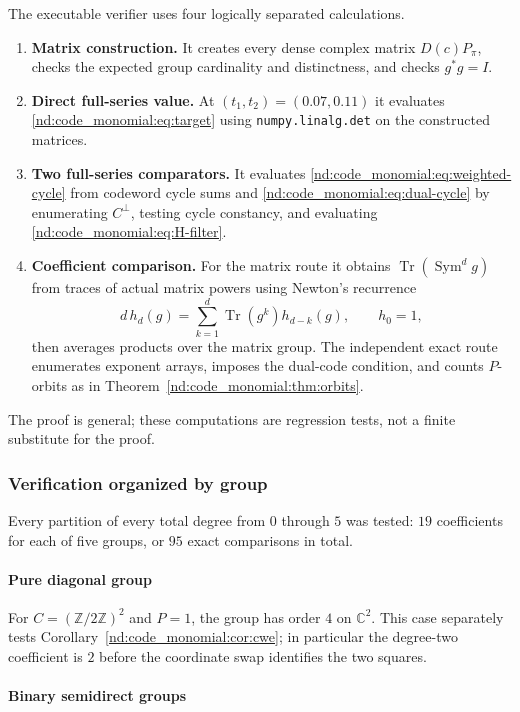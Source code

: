 \documentclass[10pt]{article}
\newcommand{\Sym}{\operatorname{Sym}}
\newcommand{\C}{\mathbb C}
\newcommand{\Z}{\mathbb Z}
\begin{document}
The executable verifier uses four logically separated calculations.
\begin{enumerate}
\item \textbf{Matrix construction.}  It creates every dense complex matrix
$D(c)P_\pi$, checks the expected group cardinality and distinctness, and
checks $g^*g=I$.
\item \textbf{Direct full-series value.}  At
$(t_1,t_2)=(0.07,0.11)$ it evaluates \eqref{nd:code_monomial:eq:target} using
\texttt{numpy.linalg.det} on the constructed matrices.
\item \textbf{Two full-series comparators.}  It evaluates
\eqref{nd:code_monomial:eq:weighted-cycle} from codeword cycle sums and
\eqref{nd:code_monomial:eq:dual-cycle} by enumerating $C^\perp$, testing cycle constancy, and
evaluating \eqref{nd:code_monomial:eq:H-filter}.
\item \textbf{Coefficient comparison.}  For the matrix route it obtains
$\operatorname{Tr}(\Sym^d g)$ from traces of actual matrix powers using
Newton's recurrence
\[
 d\,h_d(g)=\sum_{k=1}^d\operatorname{Tr}(g^k)h_{d-k}(g),\qquad h_0=1,
\]
then averages products over the matrix group.  The independent exact route
enumerates exponent arrays, imposes the dual-code condition, and counts
$P$-orbits as in Theorem~\ref{nd:code_monomial:thm:orbits}.
\end{enumerate}
The proof is general; these computations are regression tests, not a finite
substitute for the proof.

\subsubsection{Verification organized by group}

Every partition of every total degree from $0$ through $5$ was tested: $19$
coefficients for each of five groups, or $95$ exact comparisons in total.

\paragraph{Pure diagonal group}

For $C=(\Z/2\Z)^2$ and $P=1$, the group has order $4$ on $\C^2$.  This
case separately tests Corollary~\ref{nd:code_monomial:cor:cwe}; in particular the degree-two
coefficient is $2$ before the coordinate swap identifies the two squares.

\paragraph{Binary semidirect groups}
\end{document}
